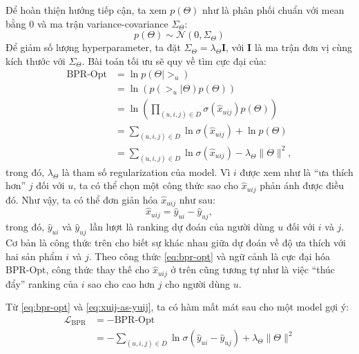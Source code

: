 Để hoàn thiện hướng tiếp cận, ta xem $p(\Theta)$ như là phân phối chuẩn với mean bằng 0 và ma trận variance-covariance $\Sigma_{\Theta}$:
\begin{equation}
    p(\Theta) \sim \mathcal{N}(0, \Sigma_{\Theta})
\end{equation}
Để giảm số lượng hyperparameter, ta đặt $\Sigma_{\Theta} = \lambda_{\Theta} \mathbf{I}$, với $\mathbf{I}$ là ma trận đơn vị cùng kích thước với $\Sigma_{\Theta}$. Bài toán tối ưu sẽ quy về tìm cực đại của:
\begin{equation}
    \begin{aligned}
        \text{BPR-Opt} & = \ln{p(\Theta | >_u)} \\
                       & = \ln{(p(>_u | \Theta) p(\Theta))} \\
                       & = \ln{\left(\prod_{(u,i,j) \in D}{\sigma(\hat{x}_{uij})} p(\Theta)\right)} \\
                       & = \sum_{(u,i,j) \in D}{\ln{\sigma(\hat{x}_{uij})}} + \ln{p(\Theta)} \\
                       & = \sum_{(u,i,j) \in D}{\ln{\sigma(\hat{x}_{uij})}} - \lambda_{\Theta} \lVert \Theta \rVert^2,
    \end{aligned}
    \label{eq:bpr-opt}
\end{equation}
trong đó, $\lambda_{\Theta}$ là tham số regularization của model. Vì $i$ được xem như là ``ưa thích hơn'' $j$ đối với $u$, ta có thể chọn một công thức sao cho $\hat{x}_{uij}$ phản ánh được điều đó. Như vậy, ta có thể đơn giản hóa $\hat{x}_{uij}$ như sau:
\begin{equation}
    \hat{x}_{uij} = \hat{y}_{ui} - \hat{y}_{uj},
    \label{eq:xuij-as-yuij}
\end{equation}
trong đó, $\hat{y}_{ui}$ và $\hat{y}_{uj}$ lần lượt là ranking dự đoán của người dùng $u$ đối với $i$ và $j$. Cơ bản là công thức trên cho biết sự khác nhau giữa dự đoán về độ ưa thích với hai sản phẩm $i$ và $j$. Theo công thức \eqref{eq:bpr-opt} và ngữ cảnh là cực đại hóa BPR-Opt, công thức thay thế cho $\hat{x}_{uij}$ ở trên cũng tương tự như là việc ``thúc đẩy'' ranking của $i$ sao cho cao hơn $j$ cho người dùng $u$.

Từ \eqref{eq:bpr-opt} và \eqref{eq:xuij-as-yuij}, ta có hàm mất mát sau cho một model gợi ý:
\begin{equation}
    \begin{aligned}
        \mathcal{L}_{\text{BPR}} & = -\text{BPR-Opt} \\
                                 & = -\sum_{(u,i,j) \in D}{\ln{\sigma(\hat{y}_{ui} - \hat{y}_{uj})}} + \lambda_{\Theta} \lVert \Theta \rVert^2
    \end{aligned}
    \label{eq:bpr-loss}
\end{equation}

